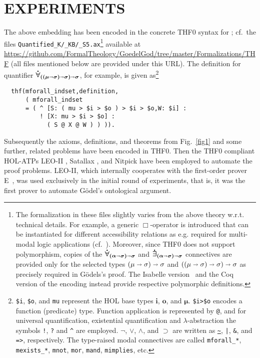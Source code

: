 \documentclass{ecai2014}
\newcommand\entity[1]{\text{\textrm{#1}}}
\def\HOL{\entity{HOL}\xspace}
\def\ar{\shortrightarrow}
\newcommand\hol[1]{\boldsymbol{#1}}
\newcommand\llift[1]{\dot{#1}}
\begin{document}
\section{EXPERIMENTS} \label{sec3} The above embedding 
has been encoded in the concrete THF0 syntax \cite{J22} for \HOL; cf.~the
files \texttt{Quantified\_K/\_KB/\_S5.ax}\footnote{The formalization in
  these files slightly varies from the above theory w.r.t. technical
  details. For example, a generic $\Box$-operator is introduced that
  can be instantiated for different accessibility relations as
  e.g. required for multi-modal logic applications
  (cf.~\cite{J23}). Moreover, since THF0 does not support
  polymorphism, copies of the $\hol{\llift{\forall}_{(\alpha\ar
      \sigma)\ar \sigma}}$ and $\hol{\llift{\exists}_{(\alpha\ar
      \sigma)\ar \sigma}}$ connectives are provided only for the
  selected types ${(\mu \ar \sigma)\ar \sigma}$ and ${((\mu \ar
    \sigma)\ar \sigma)\ar \sigma}$ as precisely required in
  G{\"o}dels's proof. The Isabelle version~\cite{J28} and the Coq
  version of the encoding instead provide respective polymorphic
  definitions.} available at
\url{https://github.com/FormalTheology/GoedelGod/tree/master/Formalizations/THF}
(all files mentioned below are provided under this URL). The
definition for quantifier
$\hol{\llift{\forall}_{((\mu \ar \sigma)\ar \sigma)\ar \sigma}}$, for
example, is given as\footnote{\texttt{\$i}, \texttt{\$o}, and
  \texttt{mu} represent the HOL base types $\hol{i}$, $\hol{o}$, and
  $\hol{\mu}$. \texttt{\$i>\$o} encodes a function (predicate) type.
  Function application is represented by \texttt{@}, and for universal
  quantification, existential quantification and $\lambda$-abstraction
  the symbols \texttt{!}, \texttt{?}  and \texttt{\^{}} are
  employed. $\hol{\neg}$, $\hol{\vee}$, $\hol{\wedge}$, and
  $\hol{\supset}$ are written as \texttt{\url{~}}, \texttt{|},
  \texttt{\&}, and \texttt{=>}, respectively. The type-raised modal
  connectives are called \texttt{mforall\_*}, \texttt{mexists\_*},
  \texttt{mnot}, \texttt{mor}, \texttt{mand}, \texttt{mimplies}, etc.}

{\footnotesize
\begin{verbatim}
  thf(mforall_indset,definition,
      ( mforall_indset
      = ( ^ [S: ( mu > $i > $o ) > $i > $o,W: $i] :
          ! [X: mu > $i > $o] :
            ( S @ X @ W ) ) )).
\end{verbatim}
}


Subsequently the axioms, definitions, and theorems from
Fig.~\ref{fig1} and some further, related problems have been encoded
in THF0. Then the THF0 compliant HOL-ATPs LEO-II \cite{LEO-II},
Satallax \cite{Satallax}, and Nitpick \cite{Nitpick} have been
employed to automate the proof problems. LEO-II, which internally
cooperates with the first-order prover E~\cite{Schulz:AICOM-2002}, was
used exclusively in the initial round of experiments, that is, it was the
first prover to automate G{\"o}del's ontological argument.
\end{document}

